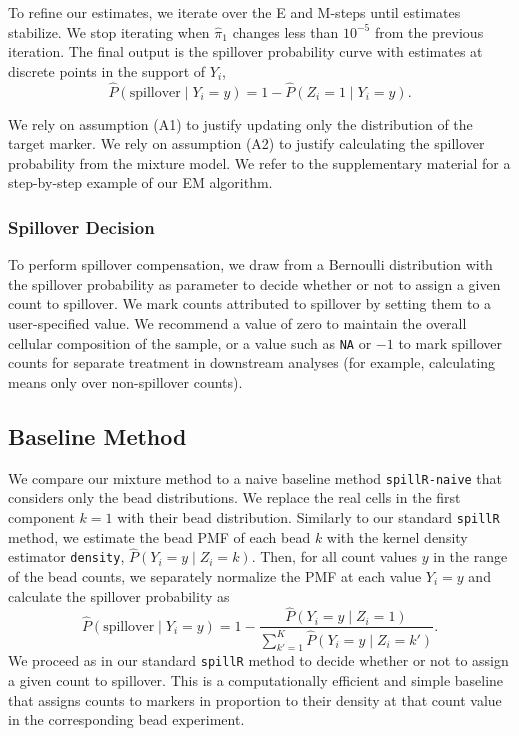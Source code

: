 \documentclass{bioinfo}
\begin{document}
To refine our estimates, we iterate over the E and M-steps until
estimates stabilize. We stop iterating when \(\hat{\pi}_1\) changes less
than \(10^{-5}\) from the previous iteration. The final output is the
spillover probability curve with estimates at discrete points in the
support of \(Y_i\), \[
\widehat{P}(\text{spillover} \mid Y_i = y) = 1 - \widehat{P}(Z_i = 1 \mid Y_i = y).
\]

We rely on assumption (A1) to justify updating only the distribution of
the target marker. We rely on assumption (A2) to justify calculating the
spillover probability from the mixture model. We refer to the
supplementary material for a step-by-step example of our EM algorithm.

\subsubsection{Spillover Decision}

To perform spillover compensation, we draw from a Bernoulli distribution
with the spillover probability as parameter to decide whether or not to
assign a given count to spillover. We mark counts attributed to
spillover by setting them to a user-specified value. We recommend a
value of zero to maintain the overall cellular composition of the
sample, or a value such as \texttt{NA} or \(-1\) to mark spillover
counts for separate treatment in downstream analyses (for example,
calculating means only over non-spillover counts).

\subsection{Baseline Method}

We compare our mixture method to a naive baseline method
\texttt{spillR-naive} that considers only the bead distributions. We
replace the real cells in the first component \(k = 1\) with their bead
distribution. Similarly to our standard \texttt{spillR} method, we
estimate the bead PMF of each bead \(k\) with the kernel density
estimator \texttt{density}, \(\widehat{P}(Y_i = y \mid Z_i = k)\). Then,
for all count values \(y\) in the range of the bead counts, we
separately normalize the PMF at each value \(Y_i = y\) and calculate the
spillover probability as \[
\widehat{P}(\text{spillover} \mid Y_i = y) = 1 - \frac{\widehat{P}(Y_i = y \mid Z_i = 1)}{\sum_{k' = 1}^K \widehat{P}(Y_i = y \mid Z_i = k')}.
\] We proceed as in our standard \texttt{spillR} method to decide
whether or not to assign a given count to spillover. This is a
computationally efficient and simple baseline that assigns counts to
markers in proportion to their density at that count value in the
corresponding bead experiment.
\end{document}
